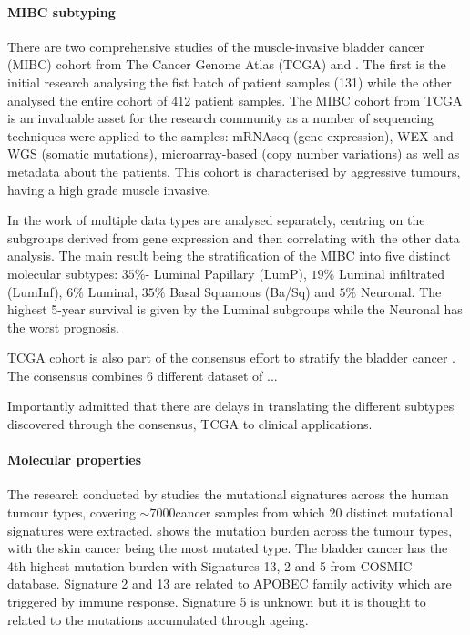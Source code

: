 \paragraph*{MIBC subtyping}

There are two comprehensive studies of the muscle-invasive bladder cancer (MIBC) cohort from The Cancer Genome Atlas (TCGA) \citet{Tcga2014-dr} and \citet{Robertson2017-mg}. The first is the initial research analysing the fist batch of patient samples (131) while the other analysed the entire cohort of 412 patient samples. The MIBC cohort from TCGA is an invaluable asset for the research community as a number of sequencing techniques were applied to the samples: mRNAseq (gene expression), WEX and WGS (somatic mutations), microarray-based (copy number variations) as well as metadata about the patients. This cohort is characterised by aggressive tumours, having a high grade muscle invasive.

In the work of \citet{Robertson2017-mg} multiple data types are analysed separately, centring on the subgroups derived from gene expression and then correlating with the other data analysis. The main result being the stratification of the MIBC into five distinct molecular subtypes: $35\%$- Luminal Papillary (LumP), $19\%$ Luminal infiltrated (LumInf), $6\%$ Luminal, $35\%$ Basal Squamous (Ba/Sq) and $5\%$ Neuronal. The highest 5-year survival is given by the Luminal subgroups while the Neuronal has the worst prognosis. 

TCGA cohort is also part of the consensus effort to stratify the bladder cancer \citet{Kamoun2020-tj}. The consensus combines 6 different dataset of ... 

Importantly \citet{Kamoun2020-tj} admitted that there are delays in translating the different subtypes discovered through the consensus, TCGA to clinical applications. 


\paragraph*{Molecular properties}

The research conducted by \citet{Alexandrov2013-gi} studies the mutational signatures across the human tumour types, covering $\sim7000 $cancer samples from which 20 distinct mutational signatures were extracted.  shows the mutation burden across the tumour types, with the skin cancer being the most mutated type. The bladder cancer has the 4th highest mutation burden with Signatures 13, 2 and 5 from COSMIC database\cite{Tate2019-yj}. Signature 2 and 13 are related to APOBEC family activity which are triggered by immune response. Signature 5 is unknown but it is thought to related to the mutations accumulated through ageing. 

